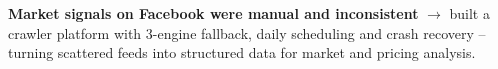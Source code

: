 
\vspace{3pt}
\begin{resume_list}
  \item \textbf{Market signals on Facebook were manual and inconsistent} $\rightarrow$ built a crawler platform with 3-engine fallback, daily scheduling and crash recovery -- turning scattered feeds into structured data for market and pricing analysis.
\end{resume_list}
